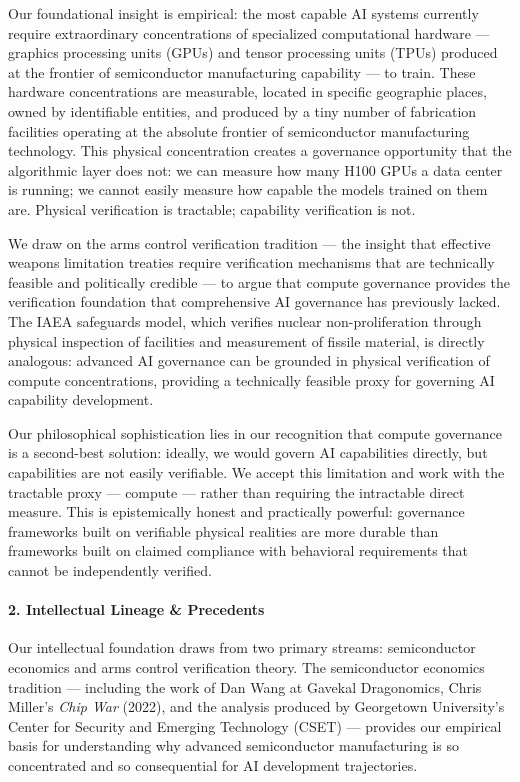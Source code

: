 Our foundational insight is empirical: the most capable AI systems
currently require extraordinary concentrations of specialized
computational hardware --- graphics processing units (GPUs) and tensor
processing units (TPUs) produced at the frontier of semiconductor
manufacturing capability --- to train. These hardware concentrations are
measurable, located in specific geographic places, owned by identifiable
entities, and produced by a tiny number of fabrication facilities
operating at the absolute frontier of semiconductor manufacturing
technology. This physical concentration creates a governance opportunity
that the algorithmic layer does not: we can measure how many H100 GPUs a
data center is running; we cannot easily measure how capable the models
trained on them are. Physical verification is tractable; capability
verification is not.

We draw on the arms control verification tradition --- the insight that
effective weapons limitation treaties require verification mechanisms
that are technically feasible and politically credible --- to argue that
compute governance provides the verification foundation that
comprehensive AI governance has previously lacked. The IAEA safeguards
model, which verifies nuclear non-proliferation through physical
inspection of facilities and measurement of fissile material, is
directly analogous: advanced AI governance can be grounded in physical
verification of compute concentrations, providing a technically feasible
proxy for governing AI capability development.

Our philosophical sophistication lies in our recognition that compute
governance is a second-best solution: ideally, we would govern AI
capabilities directly, but capabilities are not easily verifiable. We
accept this limitation and work with the tractable proxy --- compute ---
rather than requiring the intractable direct measure. This is
epistemically honest and practically powerful: governance frameworks
built on verifiable physical realities are more durable than frameworks
built on claimed compliance with behavioral requirements that cannot be
independently verified.

\paragraph{2. Intellectual Lineage \&
Precedents}\label{intellectual-lineage-precedents-8}

Our intellectual foundation draws from two primary streams:
semiconductor economics and arms control verification theory. The
semiconductor economics tradition --- including the work of Dan Wang at
Gavekal Dragonomics, Chris Miller's \emph{Chip War} (2022), and the
analysis produced by Georgetown University's Center for Security and
Emerging Technology (CSET) --- provides our empirical basis for
understanding why advanced semiconductor manufacturing is so
concentrated and so consequential for AI development trajectories.

